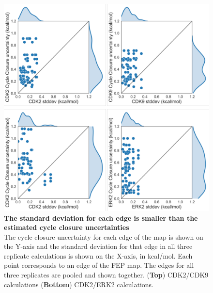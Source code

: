 \documentclass[phd,tocprelim]{cornell}
\begin{document}
\begin{appendices}
	\begin{landscape}
		\begin{figure}[p]
			\centering
			\includegraphics[width=0.55\linewidth]{figures/supp_figure9.pdf}
			\caption[The standard deviation for each edge is smaller than the estimated cycle closure uncertainties]{
				{\bf The standard deviation for each edge is smaller than the estimated cycle closure uncertainties} \\
				The cycle closure uncertainty for each edge of the map is shown on the Y-axis and the standard deviation for that edge in all three replicate calculations is shown on the X-axis, in kcal/mol. Each point corresponds to an edge of the FEP map. The edges for all three replicates are pooled and shown together.  ({\bf Top}) CDK2/CDK9 calculations ({\bf Bottom}) CDK2/ERK2 calculations. 
			}
			\label{fig:sup-figure-9}
		\end{figure}
	\end{landscape}
	
\end{appendices}

\clearpage
\realsinglespacing


\end{document}

